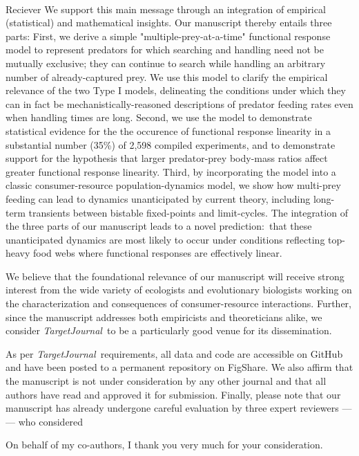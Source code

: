 \documentclass[10pt, a4paper]{letter} %
\newcommand{\TJ}{\textit{TargetJournal~}}
\begin{document}
\begin{letter}{
	\\Reciever
}
We support this main message through an integration of empirical (statistical) and mathematical insights. 
Our manuscript thereby entails three parts:
First, we derive a simple "multiple-prey-at-a-time" functional response model 
to represent predators for which searching and handling need not be 
mutually exclusive; 
they can continue to search while handling an arbitrary number of 
already-captured prey.  
We use this model to clarify the empirical relevance of the two Type I 
models, delineating the conditions under which they can in fact be 
mechanistically-reasoned descriptions of predator feeding rates even when handling times are long.  
Second, we use the model to demonstrate statistical evidence for the the occurence of functional response linearity in a substantial number (35\%) of 2,598 compiled experiments, 
and to demonstrate support for the hypothesis that larger predator-prey body-mass ratios affect 
greater functional response linearity.
Third, by incorporating the model into a classic consumer-resource population-dynamics model, 
we show how multi-prey feeding can lead to dynamics unanticipated by current theory, 
including long-term transients between bistable fixed-points and limit-cycles.
The integration of the three parts of our manuscript leads to a novel prediction:~that these unanticipated dynamics are most likely to occur under conditions reflecting top-heavy food webs where functional responses are effectively linear.

We believe that the foundational relevance of our manuscript will receive strong 
interest from the wide variety of ecologists and evolutionary biologists working on the characterization and consequences of consumer-resource interactions. 
Further, since the manuscript addresses both empiricists and theoreticians 
alike, we consider \TJ to be a particularly good venue for its dissemination.

As per \TJ requirements, 
all data and code are accessible on GitHub and have been posted to a permanent repository on FigShare.
We also affirm that the manuscript is not under consideration by any other 
journal and that all authors have read and approved it for submission.
Finally, please note that our manuscript has already undergone careful evaluation by three expert reviewers 
---
---
who considered 



On behalf of my co-authors, I thank you very much for your consideration.


\end{letter}
\end{document}
